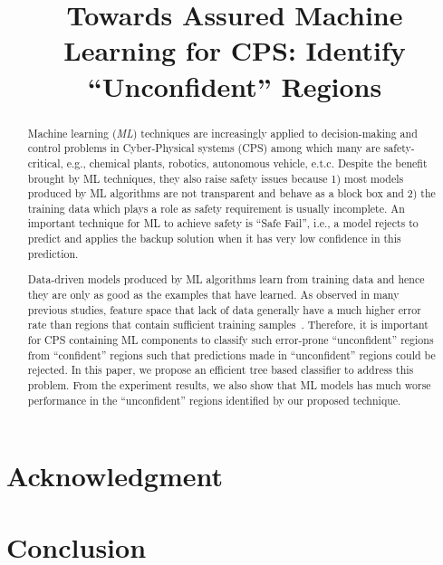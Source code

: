 \documentclass[10pt,conference]{IEEEtran}
\begin{document}
\title{Towards Assured Machine Learning for CPS: Identify ``Unconfident'' Regions}
\author{
}
\maketitle


\begin{abstract} 
Machine learning (\emph{ML})  techniques are increasingly applied to decision-making and control problems in Cyber-Physical systems (CPS)  among which many are safety-critical, e.g., chemical  plants, robotics, autonomous vehicle, e.t.c.  Despite the benefit brought by ML techniques, they also raise safety issues because  1) most models produced by ML algorithms are not transparent and behave as  a block box and 2) the training data which plays a role as safety requirement is usually incomplete. An important  technique for  ML  to achieve safety  is ``Safe Fail'', i.e., a model rejects to predict and applies the backup solution when it has very low confidence in this prediction.  

Data-driven models produced by ML algorithms learn from training data and hence they are only as good as the examples that have learned.   As observed in many previous studies, feature space that lack of data generally have a much higher error rate than regions that contain sufficient  training samples~\cite{weiss2004mining}. Therefore, it is important  for CPS containing ML components  to classify such error-prone ``unconfident'' regions from ``confident'' regions such that predictions made in ``unconfident'' regions could be rejected.  In this paper, we propose an efficient tree based classifier to address this problem.  From the experiment results, we also show that ML models has much worse performance in the ``unconfident'' regions identified by our proposed technique. 

\end{abstract}





\section*{Acknowledgment}


\section{Conclusion}




\end{document}
